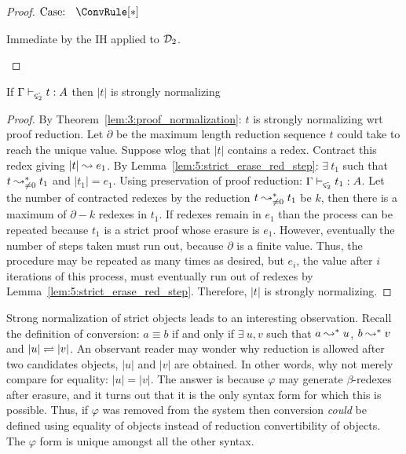\begin{proof}
    $\text{Case: }\begin{array}{c} \ConvRule[*] \end{array}$
    \begin{proofcase}
        Immediate by the IH applied to $\mathcal{D}_{2}$.
    \end{proofcase}

\end{proof}

\begin{theorem}
    \label{lem:5:strict_object_sn}
    If $\Gamma \vdash_{\ced^\text{-}} t : A$ then $|t|$ is strongly normalizing
\end{theorem}
\begin{proof}
    By Theorem~\ref{lem:3:proof_normalization}: $t$ is strongly normalizing wrt proof reduction.
    Let $\partial$ be the maximum length reduction sequence $t$ could take to reach the unique value.
    Suppose wlog that $|t|$ contains a redex.
    Contract this redex giving $|t| \leadsto e_1$.
    By Lemma~\ref{lem:5:strict_erase_red_step}: $\exists\ t_1$ such that $t \leadsto^*_{\neq 0} t_1$ and $|t_1| = e_1$.
    Using preservation of proof reduction: $\Gamma \vdash_{\ced^\text{-}} t_1 : A$.
    Let the number of contracted redexes by the reduction $t \leadsto^*_{\neq 0} t_1$ be $k$, then there is a maximum of $\partial - k$ redexes in $t_1$.
    If redexes remain in $e_1$ than the process can be repeated because $t_1$ is a strict proof whose erasure is $e_1$.
    However, eventually the number of steps taken must run out, because $\partial$ is a finite value.
    Thus, the procedure may be repeated as many times as desired, but $e_i$, the value after $i$ iterations of this process, must eventually run out of redexes by Lemma~\ref{lem:5:strict_erase_red_step}.
    Therefore, $|t|$ is strongly normalizing.
\end{proof}

Strong normalization of strict objects leads to an interesting observation.
Recall the definition of conversion: $a \equiv b$ if and only if $\exists\ u, v$ such that $a \leadsto^* u$, $b \leadsto^* v$ and $|u| \rightleftharpoons |v|$.
An observant reader may wonder why reduction is allowed after two candidates objects, $|u|$ and $|v|$ are obtained.
In other words, why not merely compare for equality: $|u| = |v|$.
The answer is because $\varphi$ may generate $\beta$-redexes after erasure, and it turns out that it is the only syntax form for which this is possible.
Thus, if $\varphi$ was removed from the system then conversion \textit{could} be defined using equality of objects instead of reduction convertibility of objects.
The $\varphi$ form is unique amongst all the other syntax.

